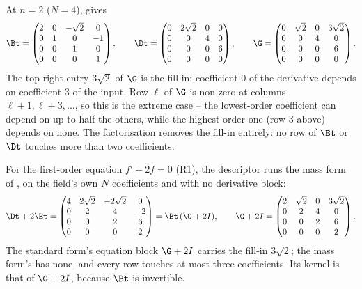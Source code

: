 At $n = 2$ ($N = 4$),  gives
\begin{equation}
    \Bt =
    \begin{pmatrix}
        2 & 0 & -\sqrt{2} & 0 \\
        0 & 1 & 0 & -1 \\
        0 & 0 & 1 & 0 \\
        0 & 0 & 0 & 1
    \end{pmatrix},
    \qquad
    \Dt =
    \begin{pmatrix}
        0 & 2\sqrt{2} & 0 & 0 \\
        0 & 0 & 4 & 0 \\
        0 & 0 & 0 & 6 \\
        0 & 0 & 0 & 0
    \end{pmatrix},
    \qquad
    \G =
    \begin{pmatrix}
        0 & \sqrt{2} & 0 & 3\sqrt{2} \\
        0 & 0 & 4 & 0 \\
        0 & 0 & 0 & 6 \\
        0 & 0 & 0 & 0
    \end{pmatrix}.
\end{equation}
The top-right entry $3\sqrt{2}$ of $\G$ is the fill-in: coefficient $0$ of the
derivative depends on coefficient $3$ of the input. Row $\ell$ of $\G$ is
non-zero at columns $\ell+1, \ell+3, \dots$, so this is the extreme case --
the lowest-order coefficient can depend on up to half the others, while the
highest-order one (row $3$ above) depends on none. The factorisation removes
the fill-in entirely: no row of $\Bt$ or $\Dt$ touches more than
two coefficients.

For the first-order equation $f' + 2f = 0$ (R1), the descriptor runs the mass form of , on the field's own $N$ coefficients and with no derivative block:
\begin{equation}
    \Dt + 2\Bt =
    \begin{pmatrix}
        4 & 2\sqrt{2} & -2\sqrt{2} & 0 \\
        0 & 2 & 4 & -2 \\
        0 & 0 & 2 & 6 \\
        0 & 0 & 0 & 2
    \end{pmatrix}
    = \Bt\,(\G + 2I) ,
    \qquad
    \G + 2I =
    \begin{pmatrix}
        2 & \sqrt{2} & 0 & 3\sqrt{2} \\
        0 & 2 & 4 & 0 \\
        0 & 0 & 2 & 6 \\
        0 & 0 & 0 & 2
    \end{pmatrix} .
    \label{eq:app-mass-form-n4}
\end{equation}
The standard form's equation block $\G+2I$ carries the fill-in $3\sqrt2$; the mass form's has none, and every row touches at most three coefficients. Its kernel is that of $\G+2I$, because $\Bt$ is invertible.

